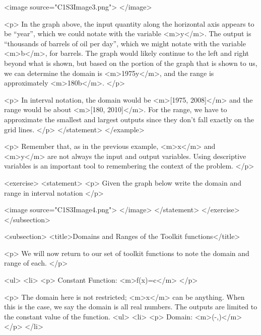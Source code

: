                 <image source="C1S3Image3.png">
                </image>

                <p>
                    In the graph above, the input quantity along the horizontal axis appears to be “year”, which we could notate with the variable <m>y</m>.
                    The output is “thousands of barrels of oil per day”, which we might notate with the variable <m>b</m>, for barrels.
                    The graph would likely continue to the left and right beyond what is shown, but based on the portion of the graph that is shown to us, we can determine the domain is <m>1975\leq y</m>, and the range is approximately <m>180\leq b</m>.
                </p>

                <p>
                    In interval notation, the domain would be <m>[1975, 2008]</m> and the range would be about <m>[180, 2010]</m>.
                    For the range, we have to approximate the smallest and largest outputs since they don’t fall exactly on the grid lines.
                </p>
            </statement>
        </example>

        <p>
            Remember that, as in the previous example, <m>x</m> and <m>y</m> are not always the input and output variables.
            Using descriptive variables is an important tool to remembering the context of the problem.
        </p>

        <exercise>
            <statement>
                <p>
                    Given the graph below write the domain and range in interval notation
                </p>

                <image source="C1S3Image4.png">
                </image>
            </statement>
        </exercise>
    </subsection>


    <subsection>
        <title>Domains and Ranges of the Toolkit functions</title>

        <p>
            We will now return to our set of toolkit functions to note the domain and range of each.
        </p>

        <ul>
            <li>
                <p>
                    Constant Function: <m>f(x)=c</m>
                </p>

                <p>
                    The domain here is not restricted; <m>x</m> can be anything.
                    When this is the case, we say the domain is all real numbers.
                    The outputs are limited to the constant value of the function.
                    <ul>
                        <li>
                            <p>
                                Domain: <m>(-\infty,\infty)</m>
                            </p>
                        </li>

